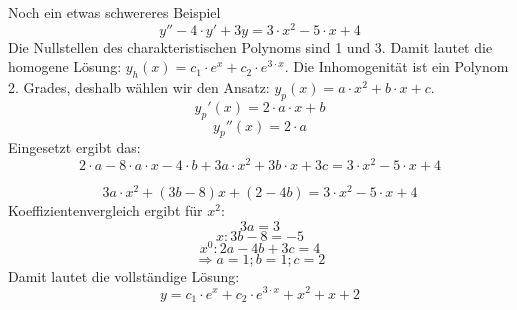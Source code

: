\documentclass[
	11pt, %
]{beamer}
\begin{document}
\begin{frame}
	\begin{exampleblock}{Noch ein etwas schwereres Beispiel}
		\begin{equation}
			y''-4\cdot y'+3y=3\cdot x^2-5\cdot x+4
		\end{equation}
		Die Nullstellen des charakteristischen Polynoms sind 1 und 3. Damit lautet die homogene L\"osung: $y_h(x)=c_1\cdot e^x+c_2\cdot e^{3\cdot x}$. Die Inhomogenit\"at ist ein Polynom 2. Grades, deshalb w\"ahlen wir den Ansatz: $y_p(x)=a\cdot x^2+b\cdot x+c$.
		\begin{equation}
			y_p'(x)=2\cdot a\cdot x+b
		\end{equation}
		\begin{equation}
			y_p''(x)=2\cdot a
		\end{equation}
		Eingesetzt ergibt das:
		\begin{equation}
			2\cdot a - 8\cdot a\cdot x-4\cdot b+3a\cdot x^2+3b\cdot x+3c = 3\cdot x^2-5\cdot x+4
		\end{equation}
	\end{exampleblock}
\end{frame}
\begin{frame}
	\begin{exampleblock}{}
		\begin{equation}
			3a\cdot x^2+(3b-8)x+(2-4b)=3\cdot x^2-5\cdot x+4
		\end{equation}
		Koeffizientenvergleich ergibt f\"ur $x^2$:
		\begin{equation}
			3a=3
		\end{equation}
		\begin{equation}
			x: 3b-8=-5
		\end{equation}
		\begin{equation}
			x^0: 2a-4b+3c=4
		\end{equation}
		\begin{equation}
			\Rightarrow a=1; b=1; c=2
		\end{equation}
		Damit lautet die vollst\"andige L\"osung:
		\begin{equation}
		y=c_1\cdot e^x+c_2\cdot e^{3\cdot x}+x^2+x+2
		\end{equation}
	\end{exampleblock}
\end{frame}
\end{document}
